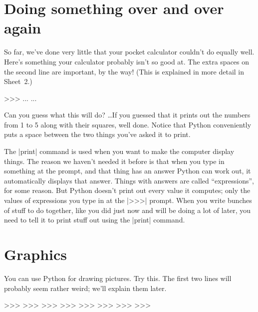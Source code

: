 \documentclass[pdftex]{wsheet}
\begin{document}
\section{Doing something over and over again}
So far, we've done very little that your pocket calculator
couldn't do equally well. Here's something your calculator
probably isn't so good at. The extra spaces on the second line
are important, by the way! (This is explained in more detail
in Sheet~2.)

\begin{interaction}[7cm]
>>> 
...          
...                         
\end{interaction}

Can you guess what this will do? \dots If you guessed that it
prints out the numbers from 1 to 5 along with their squares,
well done. Notice that Python conveniently puts a space between
the two things you've asked it to print.

\begin{note}
          The |print| command is used when you want to make the computer
          display things. The reason we haven't needed it before is
          that when you type in something at the prompt, and that thing 
          has an answer Python 
          can work out, it automatically displays that answer. Things
          with answers are called ``expressions'', for some reason.
          But Python doesn't print out {\rm every} value it computes;
          only the values of expressions you type in at the |>>>| prompt. 
          When you write bunches of stuff to do together, like you did 
          just now and will be doing a lot of later, you need to tell it 
          to print stuff out using the |print| command.
\end{note}
\section{Graphics}
You can use Python for drawing pictures. Try this. The first two lines
will probably seem rather weird; we'll explain them later.

\begin{interaction}
>>> 
>>> 
>>> 
>>> 
>>> 
>>> 
>>> 
>>> 
\end{interaction}
\end{document}
